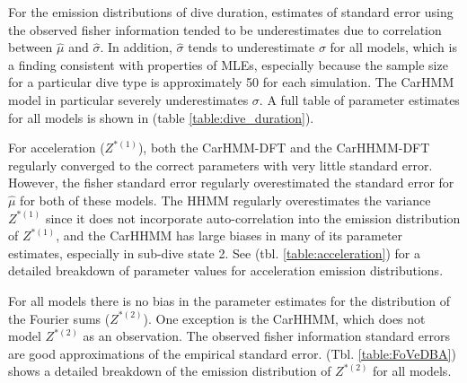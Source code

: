 For the emission distributions of dive duration, estimates of standard error using the observed fisher information tended to be underestimates due to correlation between $\hat \mu$ and $\hat \sigma$. In addition, $\hat \sigma$ tends to underestimate $\sigma$ for all models, which is a finding consistent with properties of MLEs, especially because the sample size for a particular dive type is approximately 50 for each simulation. The CarHMM model in particular severely underestimates $\sigma$. %
A full table of parameter estimates for all models is shown in (table \ref{table:dive_duration}).


For acceleration ($Z^{*(1)}$), both the CarHMM-DFT and the CarHHMM-DFT regularly converged to the correct parameters with very little standard error. However, the fisher standard error regularly overestimated the standard error for $\hat \mu$ for both of these models. 
The HHMM regularly overestimates the variance $Z^{*(1)}$ since it does not incorporate auto-correlation into the emission distribution of $Z^{*(1)}$, and the CarHHMM has large biases in many of its parameter estimates, especially in sub-dive state 2. 
See (tbl. \ref{table:acceleration}) for a detailed breakdown of parameter values for acceleration emission distributions.

For all models there is no bias in the parameter estimates for the distribution of the Fourier sums ($Z^{*(2)}$). One exception is the CarHHMM, which does not model $Z^{*(2)}$ as an observation. The observed fisher information standard errors are good approximations of the empirical standard error.
(Tbl. \ref{table:FoVeDBA}) shows a detailed breakdown of the emission distribution of $Z^{*(2)}$ for all models.

